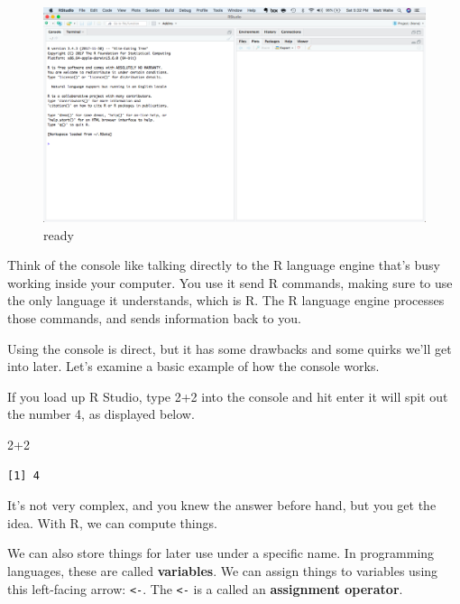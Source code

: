 \documentclass[
  letterpaper,
  DIV=11,
  numbers=noendperiod]{scrreprt}
\newenvironment{Shaded}{\begin{snugshade}}{\end{snugshade}}
\newcommand{\DecValTok}[1]{\textcolor[rgb]{0.68,0.00,0.00}{#1}}
\newcommand{\SpecialCharTok}[1]{\textcolor[rgb]{0.37,0.37,0.37}{#1}}
\begin{document}
\begin{figure}

{\centering \includegraphics{./images/verybasics1.png}

}

\caption{ready}

\end{figure}

Think of the console like talking directly to the R language engine
that's busy working inside your computer. You use it send R commands,
making sure to use the only language it understands, which is R. The R
language engine processes those commands, and sends information back to
you.

Using the console is direct, but it has some drawbacks and some quirks
we'll get into later. Let's examine a basic example of how the console
works.

If you load up R Studio, type 2+2 into the console and hit enter it will
spit out the number 4, as displayed below.

\begin{Shaded}
\begin{Highlighting}[]
\DecValTok{2}\SpecialCharTok{+}\DecValTok{2}
\end{Highlighting}
\end{Shaded}

\begin{verbatim}
[1] 4
\end{verbatim}

It's not very complex, and you knew the answer before hand, but you get
the idea. With R, we can compute things.

We can also store things for later use under a specific name. In
programming languages, these are called \textbf{variables}. We can
assign things to variables using this left-facing arrow:
\texttt{\textless{}-}. The \texttt{\textless{}-} is a called an
\textbf{assignment operator}.
\end{document}

